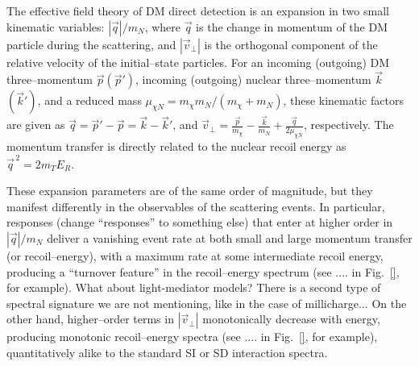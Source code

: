 \documentclass[11pt]{article}
\newcommand{\Eq}[1]{Eq.~(\ref{#1})} \newcommand{\Eqs}[2]{Eqs.~(\ref{#1}) and (\ref{#2})} \newcommand{\Eqm}[2]{Eqs.~(\ref{#1}) through (\ref{#2})}
\newcommand{\vgColor}{magenta}
\newcommand{\vg}[1]{{\color{\vgColor} #1}}
\begin{document}


The effective field theory of DM direct detection \cite{Fitzpatrick:2012ix, Anand:2013yka} is an expansion in two small kinematic variables: $|\vec q|/m_N$, where $\vec q$ is the change in momentum of the DM particle during the scattering, and $|\vec v_\perp|$ is the orthogonal component of the relative velocity of the initial--state particles. For an incoming (outgoing) DM three--momentum $\vec p(\vec p')$, incoming (outgoing) nuclear three--momentum $\vec k$ $(\vec k')$, and a reduced mass $\mu_{\chi N} = m_\chi m_N/(m_\chi +m_N)$, these kinematic factors are given as $\vec q=\vec p'-\vec p=\vec k-\vec k'$, and $\vec v_\perp=\frac{\vec p}{m_\chi}-\frac{\vec k}{m_N}+\frac{\vec q}{2\mu_{\chi N}}$, respectively.
The momentum transfer is directly related to the nuclear recoil energy as $\vec{q}^{\, 2} =2m_TE_R$. 

These expansion parameters are of the same order of magnitude, but they manifest differently in the observables of the scattering events. In particular, responses \vg{(change ``responses'' to something else)} that enter at higher order in $|\vec q|/m_N$ deliver a vanishing event rate at both small and large momentum transfer (or recoil--energy), with a maximum rate at some intermediate recoil energy, producing a ``turnover feature'' in the recoil--energy spectrum (see .... in Fig.~\ref{}, for example). \vg{What about light-mediator models? There is a second type of spectral signature we are not mentioning, like in the case of millicharge...} On the other hand, higher--order terms in $| \vec v_\perp|$ monotonically decrease with energy, producing monotonic recoil--energy spectra (see .... in Fig.~\ref{}, for example), quantitatively alike to the standard SI or SD interaction spectra. 
\end{document}
